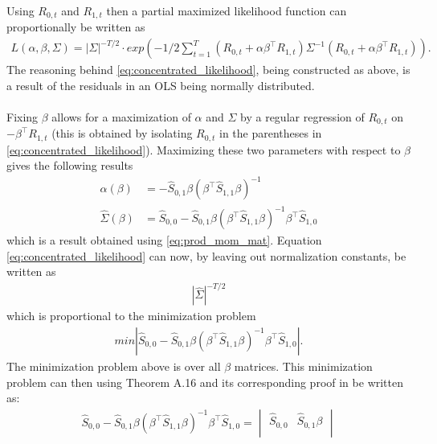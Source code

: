 \begin{bevis}
    Using $R_{0,t}$ and $R_{1,t}$ then a partial maximized likelihood function can proportionally be written as
    \begin{align}\label{eq:concentrated_likelihood}
        L(\alpha,\beta,\Sigma)=|\Sigma|^{-T/2}\cdot exp\left(-1/2\sum_{t=1}^T\left(R_{0,t}+\alpha\beta^{\top} R_{1,t}\right)\Sigma^{-1}\left(R_{0,t}+\alpha\beta^{\top} R_{1,t}\right)\right).
    \end{align}
    The reasoning behind \eqref{eq:concentrated_likelihood}, being constructed as above, is a result of the residuals in an OLS being normally distributed.\\\\
 Fixing $\beta$ allows for a maximization of $\alpha$ and $\Sigma$ by a regular regression of $R_{0,t}$ on $-\beta^\top R_{1,t}$ (this is obtained by isolating $R_{0,t}$ in the parentheses in \eqref{eq:concentrated_likelihood}). Maximizing these two parameters with respect to $\beta$ gives the following results
 \begin{align}\label{eq:max_alphaandsigma}
     \hat{\alpha}(\beta) &=-\hat{S}_{0,1}\beta(\beta^\top \hat{S}_{1,1}\beta)^{-1}\\
    \hat{\Sigma}(\beta) &=\hat{S}_{0,0}-\hat{S}_{0,1}\beta\left(\beta^\top \hat{S}_{1,1}\beta\right)^{-1}\beta^\top \hat{S}_{1,0}
 \end{align}
 which is a result obtained using \eqref{eq:prod_mom_mat}. Equation \eqref{eq:concentrated_likelihood} can now, by leaving out normalization constants, be written as
 \begin{align*}
     |\hat{\Sigma}|^{-T/2}
 \end{align*}
 which is proportional to the minimization problem
 \begin{align}
     min|\hat{S}_{0,0}-\hat{S}_{0,1}\beta\left(\beta^\top \hat{S}_{1,1}\beta\right)^{-1}\beta^\top \hat{S}_{1,0}|.%
 \end{align}
 The minimization problem above is over all $\beta$ matrices. This minimization problem can then using Theorem A.16 and its corresponding proof in \cite{Linear_Models:_Least_Squares_and_Alternatives_Second_Edition} be written as:
 \begin{align*}
     \hat{S}_{0,0}-\hat{S}_{0,1}\beta\left(\beta^\top \hat{S}_{1,1}\beta\right)^{-1}\beta^\top \hat{S}_{1,0}=\begin{vmatrix}
         \hat{S}_{0,0}&\hat{S}_{0,1}\beta\\

\end{vmatrix}
\end{align*}
\end{bevis}
